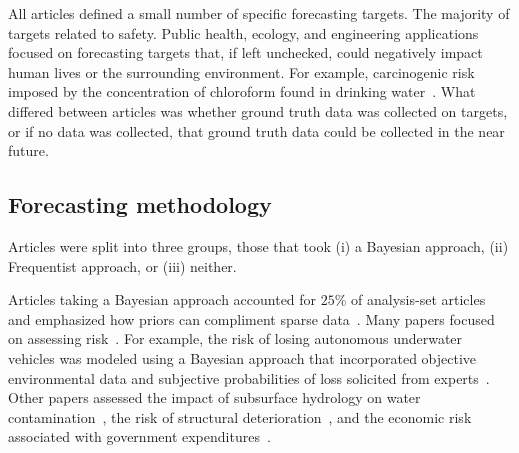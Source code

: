 \documentclass[preprint,authoryear,nonatbib]{elsarticle}
\begin{document}
All articles defined a small number of specific forecasting targets.
The majority of targets related to safety.
Public health, ecology, and engineering applications focused on forecasting targets that, if left unchecked, could negatively impact human lives or the surrounding environment.
For example, carcinogenic risk imposed by the concentration of chloroform found in drinking water~\parencite{evans1994use}.
What differed between articles was whether ground truth data was collected on targets, or if no data was collected, that ground truth data could be collected in the near future.

\subsection{Forecasting methodology}
Articles were split into three groups, those that took (i) a Bayesian approach, (ii) Frequentist approach, or (iii) neither.

Articles taking a Bayesian approach accounted for $25$\% of analysis-set articles and emphasized how priors can compliment sparse data~\parencite{zio1997accounting,bolger2017deriving,clemen2007advances,tartakovsky2007probabilistic,huang2016improving,neves2008life,abramson1996hailfinder,ren2002optimal,mantyka2014understanding,brito2016bayesian,wang2018bayesian,brito2012behavioral}.
Many papers focused on assessing risk~\parencite{zio1997accounting,brito2016bayesian,brito2012behavioral,tartakovsky2007probabilistic}.
For example, the risk of losing autonomous underwater vehicles was modeled using a Bayesian approach that incorporated objective environmental data and subjective probabilities of loss solicited from experts~\parencite{brito2016bayesian,brito2012behavioral}.
Other papers assessed the impact of subsurface hydrology on water contamination~\parencite{tartakovsky2007probabilistic}, the risk of structural deterioration~\parencite{neves2008life}, and the economic risk associated with government expenditures~\parencite{wang2018bayesian}.
\end{document}

